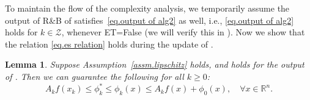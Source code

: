 \documentclass{article}
\newtheorem{lemma}[theorem]{Lemma}
\numberwithin{equation}{section}
\numberwithin{equation}{section}
\begin{document}
To maintain the flow of the complexity analysis, we temporarily assume the output of R\&B of  satisfies~\eqref{eq.output of alg2} as well, i.e., \eqref{eq.output of alg2} holds for $k\in\mathcal{Z}$, whenever ET=False (we will verify this in ). Now we show that the relation \eqref{eq.es relation} holds during the update of .
\begin{lemma}\label{lem.estimate sequence}
    Suppose Assumption~\ref{assm.lipschitz} holds, and  holds for the output of . Then we can guarantee the following for all $k\geq 0$:
    \begin{equation}
        \label{eq.estimating sequence relation}
        A_k f(x_k)\leq \phi_k^*  \leq \phi_k(x)\leq A_k f(x)+\phi_0(x), \quad \forall x\in \mathbb{R}^n.
    \end{equation}
\end{lemma}
\end{document}
